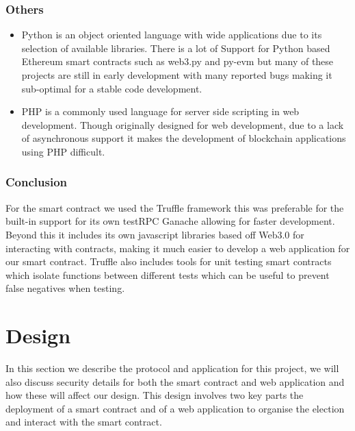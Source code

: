 \documentclass{entcs}
\begin{document}
\subsubsection{Others}
\begin{itemize}
    \item Python is an object oriented language with wide applications due to its selection of available libraries. There is a lot of Support for Python based Ethereum smart contracts such as web3.py and py-evm but many of these projects are still in early development with many reported bugs making it sub-optimal for a stable code development.
    \item PHP is a commonly used language for server side scripting in web development. Though originally designed for web development, due to a lack of asynchronous support it makes the development of blockchain applications using PHP difficult.
\end{itemize}

\subsubsection{Conclusion}
For the smart contract we used the Truffle framework this was preferable for the built-in support for its own testRPC Ganache allowing for faster development. Beyond this it includes its own javascript libraries based off Web3.0 for interacting with contracts, making it much easier to develop a web application for our smart contract. Truffle also includes tools for unit testing smart contracts which isolate functions between different tests which can be useful to prevent false negatives when testing.


\section{Design} \label{sec: Design}
In this section we describe the protocol and application for this project, we will also discuss security details for both the smart contract and web application and how these will affect our design. This design involves two key parts the deployment of a smart contract and of a web application to organise the election and interact with the smart contract.
\end{document}
